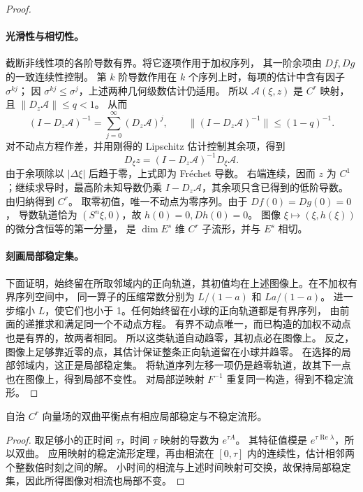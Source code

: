 \begin{proof}
\paragraph{光滑性与相切性。}
截断非线性项的各阶导数有界。将它逐项作用于加权序列，
其一阶余项由 $Df,Dg$ 的一致连续性控制。
第 $k$ 阶导数作用在 $k$ 个序列上时，每项的估计中含有因子 $\sigma^{kj}$；
因 $\sigma^{kj}\leq\sigma^j$，上述两种几何级数估计仍适用。
所以 $\mathcal A(\xi,z)$ 是 $C^r$ 映射，且 $\|D_z\mathcal A\|\leq q<1$。
从而
\[
 (I-D_z\mathcal A)^{-1}=\sum_{j=0}^\infty(D_z\mathcal A)^j,
 \qquad\|(I-D_z\mathcal A)^{-1}\|\leq(1-q)^{-1}.
\]
对不动点方程作差，并用刚得的 Lipschitz 估计控制其余项，得到
\[
 D_\xi z=(I-D_z\mathcal A)^{-1}D_\xi\mathcal A.
\]
由于余项除以 $|\Delta\xi|$ 后趋于零，上式即为 Fréchet 导数。
右端连续，因而 $z$ 为 $C^1$；继续求导时，最高阶未知导数仍乘
$I-D_z\mathcal A$，其余项只含已得到的低阶导数。由归纳得到 $C^r$。
取零初值，唯一不动点为零序列。由于 $Df(0)=Dg(0)=0$，
导数轨道恰为 $(S^n\xi,0)$，故 $h(0)=0,Dh(0)=0$。
图像 $\xi\mapsto(\xi,h(\xi))$ 的微分含恒等的第一分量，
是 $\dim E^s$ 维 $C^r$ 子流形，并与 $E^s$ 相切。

\paragraph{刻画局部稳定集。}
下面证明，始终留在所取邻域内的正向轨道，其初值均在上述图像上。在不加权有界序列空间中，
同一算子的压缩常数分别为 $L/(1-a)$ 和 $La/(1-a)$。
进一步缩小 $L$，使它们也小于 1。任何始终留在小球的正向轨道都是有界序列，
由前面的递推求和满足同一个不动点方程。
有界不动点唯一，而已构造的加权不动点也是有界的，故两者相同。
所以这类轨道自动趋零，其初点必在图像上。
反之，图像上足够靠近零的点，其估计保证整条正向轨道留在小球并趋零。
在选择的局部邻域内，这正是局部稳定集。
将轨道序列左移一项仍是趋零轨道，故其下一点也在图像上，得到局部不变性。
对局部逆映射 $F^{-1}$ 重复同一构造，得到不稳定流形。
\end{proof}
\begin{corollary}
自治 $C^r$ 向量场的双曲平衡点有相应局部稳定与不稳定流形。
\end{corollary}
\begin{proof}
取足够小的正时间 $\tau$，时间 $\tau$ 映射的导数为 $e^{\tau A}$。
其特征值模是 $e^{\tau\operatorname{Re}\lambda}$，所以双曲。
应用映射的稳定流形定理，再由相流在 $[0,\tau]$ 内的连续性，估计相邻两个整数倍时刻之间的解。
小时间的相流与上述时间映射可交换，故保持局部稳定集，因此所得图像对相流也局部不变。
\end{proof}


